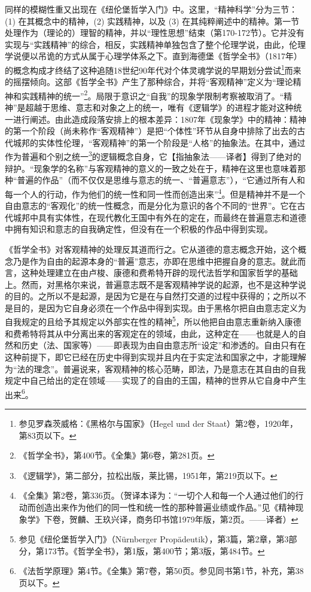 同样的模糊性重又出现在《纽伦堡哲学入门》中。这里，“精神科学”分为三节：(1) 在其概念中的精神，(2) 实践精神，以及 (3) 在其纯粹阐述中的精神。第一节处理作为（理论的）理智的精神，并以“理性思想”结束（第170-172节）。它并没有实现与“实践精神”的综合，相反，实践精神单独包含了整个伦理学说，由此，伦理学说便以吊诡的方式从属于心理学体系之下。直到海德堡《哲学全书》（1817年）的概念构成才终结了这种追随18世纪90年代对个体灵魂学说的早期划分尝试\footnote{参见罗森茨威格：《黑格尔与国家》（Hegel und der Staat）第2卷，1920年，第83页以下。}而来的摇摆倾向。这部《哲学全书》产生了那种综合，并将“客观精神”定义为“理论精神和实践精神的统一”\footnote{《哲学全书》，第400节。《全集》第6卷，第281页。}。局限于意识之“自我”的现象学限制考察被取消了。“精神”是超越于思维、意志和对象之上的统一，唯有《逻辑学》的进程才能对这种统一进行阐述。由此造成段落安排上的根本差异：1807年《现象学》中的精神：精神的第一个阶段（尚未称作“客观精神”）是把“个体性”环节从自身中排除了出去的古代城邦的实体性伦理，“客观精神”的第一个阶段是“人格”的抽象法。在其中，通过作为普遍和个别之统一\footnote{《逻辑学》，第二部分，拉松出版，莱比锡，1951年，第219页以下。}的逻辑概念自身，它【指抽象法——译者】得到了绝对的辩护。“现象学的名称”与客观精神的意义的一致之处在于，精神在这里也意味着那种“普遍的作品”（而不仅仅是思维与意志的统一、“普遍意志”），“它通过所有人和每一个人的行动，作为他们的统一性和同一性而创造出来”\footnote{《全集》第2卷，第336页。（贺译本译为：“一切个人和每一个人通过他们的行动而创造出来作为他们的同一性和统一性的那种普遍业绩或作品。”见《精神现象学》下卷，贺麟、王玖兴译，商务印书馆1979年版，第2页。——译者）}。但是精神并不是一个自由意志的“客观化”的统一性概念，而是分化为意识的各个不同的“世界”。它在古代城邦中具有实体性，在现代教化王国中有外在的定在，而最终在普遍意志和道德中拥有知识和意志的自我确定性，但没有在一个积极的作品中得到实现。

《哲学全书》对客观精神的处理反其道而行之。它从道德的意志概念开始，这个概念乃是作为自由的起源本身的“普遍”意志，亦即在思维中把握自身的意志。就此而言，这种处理建立在由卢梭、康德和费希特开辟的现代法哲学和国家哲学的基础上。然而，对黑格尔来说，普遍意志既不是客观精神学说的起源，也不是这种学说的目的。之所以不是起源，是因为它是在与自然打交道的过程中获得的；之所以不是目的，是因为它自身必须在一个作品中得到实现。由于黑格尔把自由意志定义为自我规定的且给予其规定以外部实在性的精神\footnote{参见《纽伦堡哲学入门》（Nürnberger Propädeutik），第3篇，第2章，第3部分，第173节。《哲学全书》，第1版，第400节；第3版，第484节。}，所以他把自由意志重新纳入康德和费希特将其从中分离出来的客观定在的领域，由此，这种定在——也就是人的自然和历史（法、国家等）——即表现为由自由意志所“设定”和渗透的。自由只有在这种前提下，即它已经在历史中得到实现并且内在于实定法和国家之中，才能理解为“法的理念”。普遍说来，客观精神的核心范畴，即法，乃是意志在其自由的自我规定中自己给出的定在领域——实现了的自由的王国，精神的世界从它自身中产生出来\footnote{《法哲学原理》第4节。《全集》第7卷，第50页。参见同书第1节，补充，第38页以下。}。

